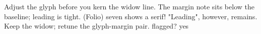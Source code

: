 Adjust the glyph before you kern the widow line.
The margin note sits below the baseline; leading is tight.
(Folio) seven shows a serif! "Leading", however, remains.
Keep the widow; retune the glyph-margin pair.
flagged? yes
